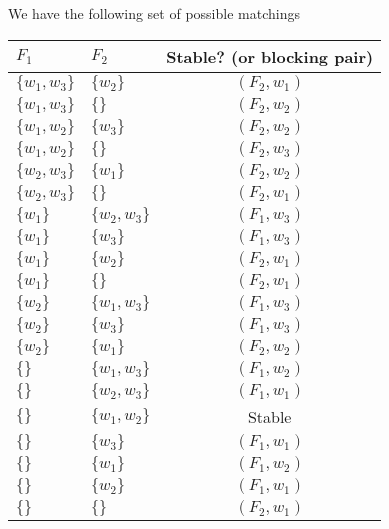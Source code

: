 \documentclass[12pt]{article}
\begin{document}
We have the following set of possible matchings
\begin{center}
\begin{tabular}{l | l || c }
$F_1$ & $F_2$ & Stable? (or blocking pair)\\\hline
$\{w_1, w_3\}$ & $\{w_2\}$ & $(F_2, w_1)$\\
$\{w_1, w_3\}$ & $\{\}$ & $(F_2, w_2)$\\
$\{w_1, w_2\}$ & $\{w_3\}$ & $(F_2, w_2)$\\
$\{w_1, w_2\}$ & $\{\}$ & $(F_2, w_3)$\\
$\{w_2, w_3\}$ & $\{w_1\}$ & $(F_2, w_2)$\\
$\{w_2, w_3\}$ & $\{\}$ & $(F_2, w_1)$\\
$\{w_1\}$ & $\{w_2, w_3\}$ & $(F_1, w_3)$\\
$\{w_1\}$ & $\{w_3\}$ & $(F_1, w_3)$\\
$\{w_1\}$ & $\{w_2\}$ & $(F_2, w_1)$\\
$\{w_1\}$ & $\{\}$ & $(F_2, w_1)$\\
$\{w_2\}$ & $\{w_1, w_3\}$ & $(F_1, w_3)$\\
$\{w_2\}$ & $\{w_3\}$ & $(F_1, w_3)$\\
$\{w_2\}$ & $\{w_1\}$ & $(F_2, w_2)$\\
$\{\}$ & $\{w_1, w_3\}$ & $(F_1, w_2)$\\
$\{\}$ & $\{w_2, w_3\}$ & $(F_1, w_1)$\\
$\{\}$ & $\{w_1, w_2\}$ & Stable\\
$\{\}$ & $\{w_3\}$ & $(F_1, w_1)$\\
$\{\}$ & $\{w_1\}$ & $(F_1, w_2)$\\
$\{\}$ & $\{w_2\}$ & $(F_1, w_1)$\\
$\{\}$ & $\{\}$ & $(F_2, w_1)$
\end{tabular}
\end{center}
\end{document}
